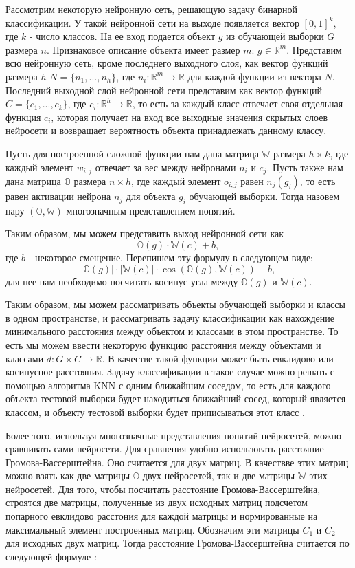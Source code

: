 \documentclass{article}
\begin{document}
Рассмотрим некоторую нейронную сеть, решающую задачу бинарной классификации. У такой нейронной сети на выходе появляется вектор $[0, 1]^k$, где $k$ - число классов. На ее вход подается объект $g$ из обучающей выборки $G$ размера $n$. Признаковое описание объекта имеет размер $m$: $g \in \mathbb{R}^m$. Представим всю нейронную сеть, кроме последнего выходного слоя, как вектор функций размера $h$ $N = \{ n_1, ..., n_h \}$, где $n_i: \mathbb{R}^m \rightarrow \mathbb{R}$ для каждой функции из вектора $N$. Последний выходной слой нейронной сети представим как вектор функций $C = \{ c_1, ..., c_k \}$, где $c_i: \mathbb{R}^h \rightarrow \mathbb{R}$, то есть за каждый класс отвечает своя отдельная функция $c_i$, которая получает на вход все выходные значения скрытых слоев нейросети и возвращает вероятность объекта принадлежать данному классу. 

Пусть для построенной сложной функции нам дана матрица $\mathbb{W}$ размера $h \times k$, где каждый элемент $w_{i, j}$ отвечает за вес между нейронами $n_i$ и $c_j$. Пусть также нам дана матрица $\mathbb{O}$ размера $n \times h$, где каждый элемент $o_{i, j}$ равен $n_j(g_i)$, то есть равен активации нейрона $n_j$ для объекта $g_i$ обучающей выборки. Тогда назовем пару $(\mathbb{O}, \mathbb{W})$ многозначным представлением понятий.

Таким образом, мы можем представить выход нейронной сети как $$\mathbb{O}(g) \cdot \mathbb{W}(c) + b,$$ где $b$ - некоторое смещение. Перепишем эту формулу в следующем виде: $$|\mathbb{O}(g)| \cdot |\mathbb{W}(c)| \cdot \cos{(\mathbb{O}(g), \mathbb{W}(c))} + b,$$ для нее нам необходимо посчитать косинус угла между $\mathbb{O}(g)$ и $\mathbb{W}(c)$. 

Таким образом, мы можем рассматривать объекты обучающей выборки и классы в одном пространстве, и рассматривать задачу классификации как нахождение минимального расстояния между объектом и классами в этом пространстве. То есть мы можем ввести некоторую функцию расстояния между объектами и классами $d: G \times C \rightarrow \mathbb{R}$. В качестве такой функции может быть евклидово или косинусное расстояния. Задачу классификации в такое случае можно решать с помощью алгоритма KNN с одним ближайшим соседом, то есть для каждого объекта тестовой выборки будет находиться ближайший сосед, который является классом, и объекту тестовой выборки будет приписываться этот класс \citep{3}.

Более того, используя многозначные представления понятий нейросетей, можно сравнивать сами нейросети. Для сравнения удобно использовать расстояние Громова-Вассерштейна. Оно считается для двух матриц. В качествве этих матриц можно взять как две матрицы $\mathbb{O}$ двух нейросетей, так и две матрицы $\mathbb{W}$ этих нейросетей. Для того, чтобы посчитать расстояние Громова-Вассерштейна, строятся две матрицы, полученные из двух исходных матриц подсчетом попарного евклидово расстония для каждой матрицы и нормированные на максимальный элемент построенных матриц. Обозначим эти матрицы $C_1$ и $C_2$ для исходных двух матриц. Тогда расстояние Громова-Вассерштейна считается по следующей формуле \citep{4}:
\end{document}

